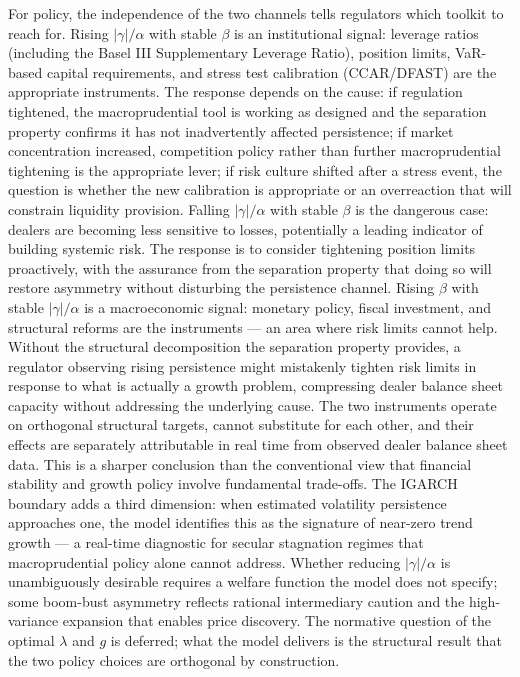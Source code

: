 \documentclass[12pt,a4paper]{article}
\theoremstyle{definition}
\begin{document}
For policy, the independence of the two channels tells regulators which
toolkit to reach for. Rising $|\gamma|/\alpha$ with stable $\beta$ is
an institutional signal: leverage ratios (including the Basel III
Supplementary Leverage Ratio), position limits, VaR-based capital
requirements, and stress test calibration (CCAR/DFAST) are the
appropriate instruments. The response depends on the cause: if
regulation tightened, the macroprudential tool is working as designed
and the separation property confirms it has not inadvertently affected
persistence; if market concentration increased, competition policy
rather than further macroprudential tightening is the appropriate lever;
if risk culture shifted after a stress event, the question is whether
the new calibration is appropriate or an overreaction that will
constrain liquidity provision. Falling $|\gamma|/\alpha$ with stable
$\beta$ is the dangerous case: dealers are becoming less sensitive to
losses, potentially a leading indicator of building systemic risk. The
response is to consider tightening position limits proactively, with
the assurance from the separation property that doing so will restore
asymmetry without disturbing the persistence channel. Rising $\beta$
with stable $|\gamma|/\alpha$ is a macroeconomic signal: monetary
policy, fiscal investment, and structural reforms are the instruments
--- an area where risk limits cannot help. Without the structural
decomposition the separation property provides, a regulator observing
rising persistence might mistakenly tighten risk limits in response to
what is actually a growth problem, compressing dealer balance sheet
capacity without addressing the underlying cause. The two instruments
operate on orthogonal structural targets, cannot substitute for each
other, and their effects are separately attributable in real time from
observed dealer balance sheet data.
This is a sharper conclusion than the conventional view that financial
stability and growth policy involve fundamental trade-offs. The
IGARCH boundary adds a third dimension: when estimated volatility
persistence approaches one, the model identifies this as the signature
of near-zero trend growth --- a real-time diagnostic for secular
stagnation regimes that macroprudential policy alone cannot address.
Whether reducing $|\gamma|/\alpha$ is unambiguously desirable requires a
welfare function the model does not specify; some boom-bust asymmetry
reflects rational intermediary caution and the high-variance expansion
that enables price discovery. The normative question of the optimal
$\lambda$ and $g$ is deferred; what the model delivers is the structural
result that the two policy choices are orthogonal by construction.
\end{document}
